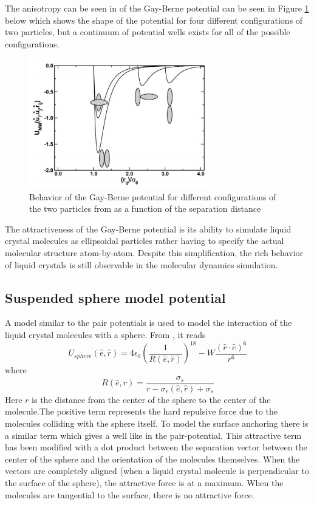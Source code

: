 \documentclass[preprint, aps]{revtex4-1}
\begin{document}
The anisotropy can be seen in of the Gay-Berne potential can be seen in Figure 
\ref{fig:gb} below which shows the shape of the potential for four different 
configurations of two particles, but a continuum of potential wells exists for 
all of the possible configurations. 
	\begin{figure}[H]
		\centering
		\includegraphics[width=0.7\textwidth]{gb.png}
		\caption{Behavior of the Gay-Berne potential for different 
			configurations of the two particles from \cite{moreno11} as a 
			function of the separation distance}
		\label{fig:gb}
	\end{figure}
The attractiveness of the Gay-Berne potential is its ability to simulate liquid 
crystal molecules as ellipsoidal particles rather having to specify the actual 
molecular structure atom-by-atom. Despite this simplification, the rich behavior
of liquid crystals is still observable in the molecular dynamics simulation.

\subsection*{Suspended sphere model potential}
A model similar to the pair potentials is used to model the interaction of the
liquid crystal molecules with a sphere. From \cite{lubensky98}, it reads
	\begin{equation} \label{sphere-pot}
		U_{sphere} (\hat{e}, \hat{r}) 
		= 4\epsilon_0 \left(\frac{1}{R(\hat{e}, \hat{r})}\right)^{18}
		- W\frac{
			(\hat{r}\cdot\hat{e})^6
			}
			{
			r^6
			}
	\end{equation}
where 
	\begin{equation}
		R(\hat{e}, \hat{r}) = 
		\frac{
			\sigma_s
		}
		{
			r - \sigma_r(\hat{e}, \hat{r}) + \sigma_s
		}
	\end{equation}
Here $r$ is the distance from the center of the sphere to the center of the
molecule.The positive term represents the hard repulsive force due to the
molecules colliding with the sphere itself. To model the surface anchoring there
is a similar term which gives a well like in the pair-potential. This attractive
term has been modified with a dot product between the separation vector between
the center of the sphere and the orientation of the molecules themselves. When
the vectors are completely aligned (when a liquid crystal molecule is
perpendicular to the surface of the sphere), the attractive force is at a
maximum. When the molecules are tangential to the surface, there is no 
attractive force.
\end{document}
